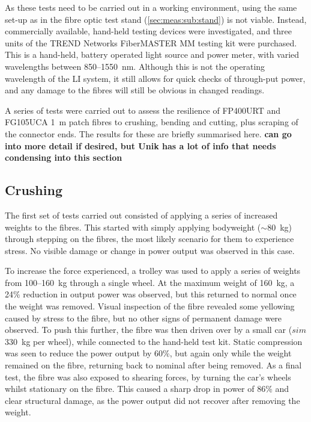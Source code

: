 \documentclass[a4paper,11pt]{article}
\let\oldsim\sim
\renewcommand{\sim}{{\oldsim}}
\begin{document}
As these tests need to be carried out in a working environment, using the same set-up as in the fibre optic test stand (\cref{sec:meas:sub:stand}) is not viable. Instead, commercially available, hand-held testing devices were investigated, and three units of the TREND Networks FiberMASTER MM testing kit \cite{bib:TREND} were purchased. This is a hand-held, battery operated light source and power meter, with varied wavelengths between 850--1550~nm. Although this is not the operating wavelength of the LI system, it still allows for quick checks of through-put power, and any damage to the fibres will still be obvious in changed readings.

A series of tests were carried out to assess the resilience of FP400URT and FG105UCA 1~m patch fibres to crushing, bending and cutting, plus scraping of the connector ends. The results for these are briefly summarised here. {\bf can go into more detail if desired, but Unik has a lot of info that needs condensing into this section}

\subsection{Crushing}
The first set of tests carried out consisted of applying a series of increased weights to the fibres. This started with simply applying bodyweight ($\sim80$~kg) through stepping on the fibres, the most likely scenario for them to experience stress. No visible damage or change in power output was observed in this case.

To increase the force experienced, a trolley was used to apply a series of weights from 100--160~kg through a single wheel. At the maximum weight of 160~kg, a 24\% reduction in output power was observed, but this returned to normal once the weight was removed. Visual inspection of the fibre revealed some yellowing caused by stress to the fibre, but no other signs of permanent damage were observed. To push this further, the fibre was then driven over by a small car ($sim$330~kg per wheel), while connected to the hand-held test kit. Static compression was seen to reduce the power output by 60\%, but again only while the weight remained on the fibre, returning back to nominal after being removed. As a final test, the fibre was also exposed to shearing forces, by turning the car's wheels whilst stationary on the fibre. This caused a sharp drop in power of 86\% and clear structural damage, as the power output did not recover after removing the weight.
\end{document}
